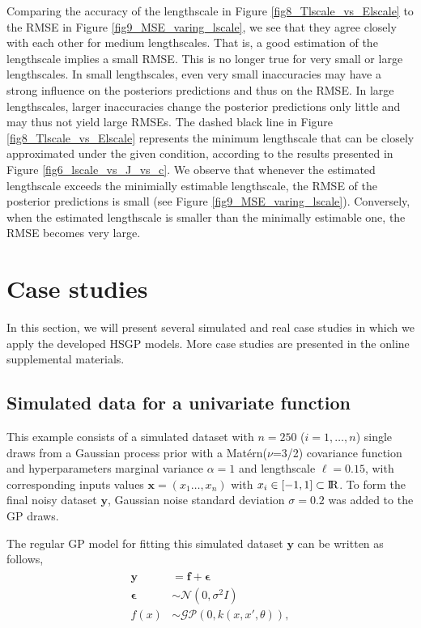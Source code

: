 \documentclass[onecolumn,a4paper,11pt]{article}
\begin{document}
Comparing the accuracy of the lengthscale in Figure 
\ref{fig8_Tlscale_vs_Elscale} to the RMSE in Figure \ref{fig9_MSE_varing_lscale},
we see that they agree closely with each other for medium lengthscales.
That is, a good estimation of the lengthscale implies a
small RMSE. This is no longer true for very small or large lengthscales.
In small lengthscales, even very small inaccuracies 
may have a strong influence on the posteriors predictions and thus on the RMSE.
In large lengthscales, larger inaccuracies change the posterior predictions
only little and may thus not yield large RMSEs.
The dashed black line in Figure \ref{fig8_Tlscale_vs_Elscale} represents the 
minimum lengthscale that can be closely approximated under the given condition, according to the results presented in Figure \ref{fig6_lscale_vs_J_vs_c}. 
We observe that whenever the estimated lengthscale exceeds the minimially
estimable lengthscale, the RMSE of the posterior predictions is small
(see Figure \ref{fig9_MSE_varing_lscale}).
Conversely, when the estimated lengthscale is smaller than the minimally
estimable one, the RMSE becomes very large.


\section{Case studies}\label{ch5_sec_cases}

In this section, we will present several simulated and real case studies in which we apply the developed HSGP models. More case studies are presented in the online supplemental materials.

\subsection{Simulated data for a univariate function}\label{ch5_sec_univariate_simu}

This example consists of a simulated dataset with $n=250$ ($i=1,\dots,n$) single draws from a Gaussian process prior with a Mat{\'e}rn($\nu$=3/2) covariance function and hyperparameters marginal variance $\alpha=1$ and lengthscale $\ell=0.15$, with corresponding inputs values $\bm{x}=(x_1\dots,x_n)$ with $x_i \in [-1,1] \subset {\rm I\!R}$. To form the final noisy dataset $\bm{y}$, Gaussian noise standard deviation $\sigma=0.2$ was added to the GP draws.

The regular GP model for fitting this simulated dataset $\bm{y}$ can be written as follows,
%
\begin{align*}\label{ch5_eq_latentgp_simudata1}
\begin{split}
\bm{y} &= \bm{f} + \bm{\epsilon} \\
\bm{\epsilon} &\sim \mathcal{N}(0, \sigma^2  I) \\
f(x) &\sim \mathcal{GP}(0, k(x, x', \theta)),
\end{split}
\end{align*}
\end{document}
